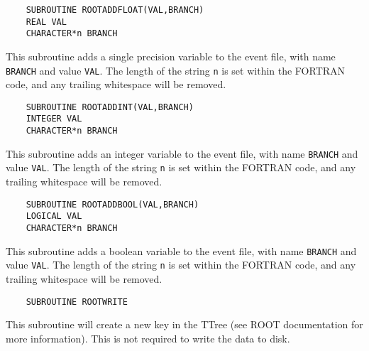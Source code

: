 \documentclass[a4paper,12pt]{article}
\begin{document}
\begin{verbatim}
    SUBROUTINE ROOTADDFLOAT(VAL,BRANCH)
    REAL VAL
    CHARACTER*n BRANCH\end{verbatim}
This subroutine adds a single precision variable to the event file, with name \verb|BRANCH| and value \verb|VAL|. The length of the string \verb|n| is set within the FORTRAN code, and any trailing whitespace will be removed.

\begin{verbatim}
    SUBROUTINE ROOTADDINT(VAL,BRANCH)
    INTEGER VAL
    CHARACTER*n BRANCH\end{verbatim}
This subroutine adds an integer variable to the event file, with name \verb|BRANCH| and value \verb|VAL|. The length of the string \verb|n| is set within the FORTRAN code, and any trailing whitespace will be removed.

\begin{verbatim}
    SUBROUTINE ROOTADDBOOL(VAL,BRANCH)
    LOGICAL VAL
    CHARACTER*n BRANCH\end{verbatim}
This subroutine adds a boolean variable to the event file, with name \verb|BRANCH| and value \verb|VAL|. The length of the string \verb|n| is set within the FORTRAN code, and any trailing whitespace will be removed.

\begin{verbatim}
    SUBROUTINE ROOTWRITE\end{verbatim}
This subroutine will create a new key in the TTree (see ROOT documentation for more information). This is not required to write the data to disk.
\end{document}
